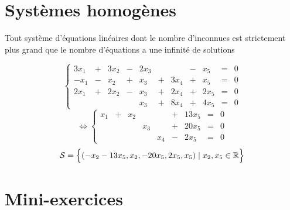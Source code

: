 \section{Systèmes homogènes}

\begin{frame}
\begin{theoreme}
Tout système  d'équations linéaires dont le nombre d'inconnues est strictement 
plus grand que le nombre d'équations a une infinité de solutions
\end{theoreme}
\pause

\[\left\{
 \begin{array}{ccccccccccc}
3x_1 &+ &3x_2 &- &2x_3 &&&- &x_5 & = & 0\\
 -x_1 &- &x_2 &+ &x_3 &+ &3x_4 &+ &x_5 & = & 0\\
 2x_1 &+ &2x_2 &- &x_3 &+ &2x_4 &+ &2x_5 & = & 0\\
 &&&&x_3 &+ &8x_4 &+ &4x_5 & = & 0
\end{array} \right.
\] 
\pause
\[ \iff \left\{
\begin{array}{ccccccccc}
x_1 &+ &x_2 &&& + &13x_5 & = & 0\\
&&&x_3 & &+ &20x_5 & = & 0\\
&&&&x_4  &-&2x_5 & = & 0
\end{array} \right.
\]
\pause
$$\mathcal{S}= \Big\lbrace (-x_2-13x_5, x_2,-20x_5, 2x_5, x_5) \mid x_2,x_5 \in \mathbb{R} \Big\rbrace$$



\end{frame}




\section{Mini-exercices}

